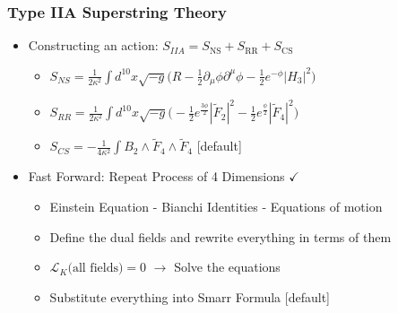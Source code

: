 \documentclass[t]{beamer}
\begin{document}
\begin{frame}
\frametitle{Type IIA Superstring Theory}

\begin{itemize}
\setlength{\parskip}{10pt}
\item<1-> Constructing an action: $S_{IIA} = S_\text{NS} + S_{\text{RR}} + S_{\text{CS}}$

\begin{itemize}
[triangle]
\setlength{\parskip}{6pt}
\item<2-> $S_{NS} = \frac{1}{2\kappa^{2}} \int d^{10}x \sqrt{-g} \Big(R - \frac{1}{2} \partial_{\mu} \phi \partial^{\mu} \phi - \frac{1}{2} e^{-\phi} {|H_{3}|}^2 \Big)$
\vspace{6pt}
\item<2-> $S_{RR} = \frac{1}{2\kappa^{2}} \int d^{10}x \sqrt{-g} \Big( - \frac{1}{2} e^{\frac{3\phi}{2}} {|\tilde{F}_{2}|}^2 - \frac{1}{2} e^{\frac{\phi}{2}} {|\tilde{F}_{4}|}^2 \Big)$
\vspace{6pt}
\item<2-> $S_{CS} = - \frac{1}{4\kappa^{2}} \int B_{2} \wedge {\tilde{F}}_{4} \wedge {\tilde{F}}_{4}$
[default]
\end{itemize}

\vspace{5pt}

\item<3-> Fast Forward: Repeat Process of 4 Dimensions $\checkmark$

\begin{itemize}
[triangle]
\setlength{\parskip}{5pt}
\item \small{Einstein Equation - Bianchi Identities - Equations of motion}
\item \small{Define the dual fields and rewrite everything in terms of them}
\item \small{$\mathcal{L}_{K} \text{(all fields)} = 0$ $\rightarrow$ Solve the equations}
\item \small{Substitute everything into Smarr Formula}
[default]
\end{itemize}
\end{itemize}
\end{frame}

\end{document}
